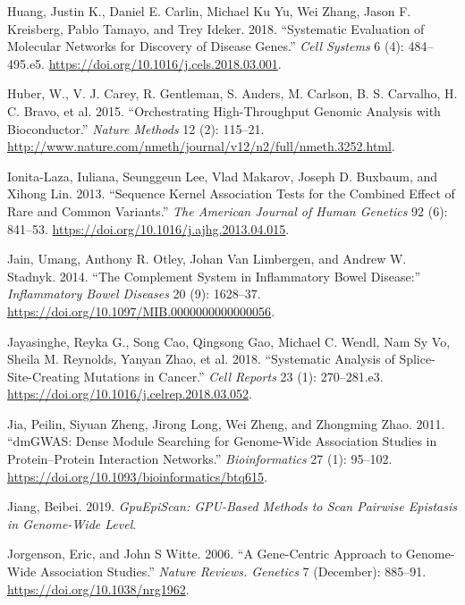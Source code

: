 \documentclass[
  11pt,
]{env/yjiao}
\newlength{\cslhangindent}
\newenvironment{cslreferences}%
  {\setlength{\parindent}{0pt}%
  \everypar{\setlength{\hangindent}{\cslhangindent}}\ignorespaces}%
  {\par}
\begin{document}
\begin{cslreferences}
\leavevmode\hypertarget{ref-huang_systematic_2018}{}%
Huang, Justin K., Daniel E. Carlin, Michael Ku Yu, Wei Zhang, Jason F. Kreisberg, Pablo Tamayo, and Trey Ideker. 2018. ``Systematic Evaluation of Molecular Networks for Discovery of Disease Genes.'' \emph{Cell Systems} 6 (4): 484--495.e5. \url{https://doi.org/10.1016/j.cels.2018.03.001}.

\leavevmode\hypertarget{ref-bioconductor}{}%
Huber, W., V. J. Carey, R. Gentleman, S. Anders, M. Carlson, B. S. Carvalho, H. C. Bravo, et al. 2015. ``Orchestrating High-Throughput Genomic Analysis with Bioconductor.'' \emph{Nature Methods} 12 (2): 115--21. \url{http://www.nature.com/nmeth/journal/v12/n2/full/nmeth.3252.html}.

\leavevmode\hypertarget{ref-ionita-laza_sequence_2013}{}%
Ionita-Laza, Iuliana, Seunggeun Lee, Vlad Makarov, Joseph D. Buxbaum, and Xihong Lin. 2013. ``Sequence Kernel Association Tests for the Combined Effect of Rare and Common Variants.'' \emph{The American Journal of Human Genetics} 92 (6): 841--53. \url{https://doi.org/10.1016/j.ajhg.2013.04.015}.

\leavevmode\hypertarget{ref-jain_complement_2014}{}%
Jain, Umang, Anthony R. Otley, Johan Van Limbergen, and Andrew W. Stadnyk. 2014. ``The Complement System in Inflammatory Bowel Disease:'' \emph{Inflammatory Bowel Diseases} 20 (9): 1628--37. \url{https://doi.org/10.1097/MIB.0000000000000056}.

\leavevmode\hypertarget{ref-jayasinghe_systematic_2018}{}%
Jayasinghe, Reyka G., Song Cao, Qingsong Gao, Michael C. Wendl, Nam Sy Vo, Sheila M. Reynolds, Yanyan Zhao, et al. 2018. ``Systematic Analysis of Splice-Site-Creating Mutations in Cancer.'' \emph{Cell Reports} 23 (1): 270--281.e3. \url{https://doi.org/10.1016/j.celrep.2018.03.052}.

\leavevmode\hypertarget{ref-jia_dmgwas:_2011}{}%
Jia, Peilin, Siyuan Zheng, Jirong Long, Wei Zheng, and Zhongming Zhao. 2011. ``dmGWAS: Dense Module Searching for Genome-Wide Association Studies in Protein--Protein Interaction Networks.'' \emph{Bioinformatics} 27 (1): 95--102. \url{https://doi.org/10.1093/bioinformatics/btq615}.

\leavevmode\hypertarget{ref-gpuEpiScan}{}%
Jiang, Beibei. 2019. \emph{GpuEpiScan: GPU-Based Methods to Scan Pairwise Epistasis in Genome-Wide Level}.

\leavevmode\hypertarget{ref-Jorgenson}{}%
Jorgenson, Eric, and John S Witte. 2006. ``A Gene-Centric Approach to Genome-Wide Association Studies.'' \emph{Nature Reviews. Genetics} 7 (December): 885--91. \url{https://doi.org/10.1038/nrg1962}.


\end{cslreferences}
\end{document}
